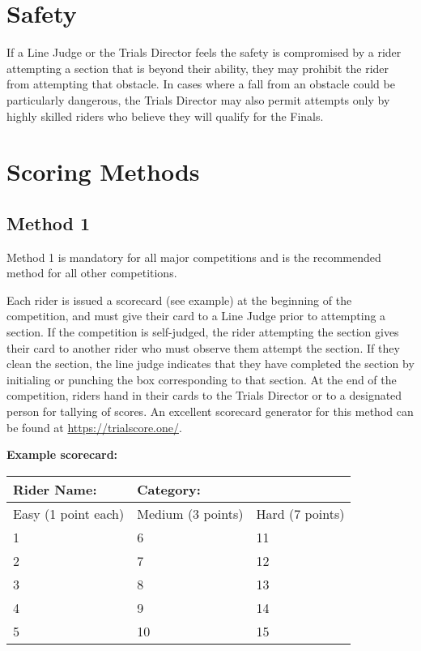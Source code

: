 \section{Safety}

If a Line Judge or the Trials Director feels the safety is compromised by a rider attempting a section that is beyond their ability, they may prohibit the rider from attempting that obstacle.
In cases where a fall from an obstacle could be particularly dangerous, the Trials Director may also permit attempts only by highly skilled riders who believe they will qualify for the Finals.

\section{Scoring Methods}

\subsection{Method 1}
Method 1 is mandatory for all major competitions and is the recommended method for all other competitions.

Each rider is issued a scorecard (see example) at the beginning of the competition, and must give their card to a Line Judge prior to attempting a section.
If the competition is self-judged, the rider attempting the section gives their card to another rider who must observe them attempt the section.
If they clean the section, the line judge indicates that they have completed the section by initialing or punching the box corresponding to that section.
At the end of the competition, riders hand in their cards to the Trials Director or to a designated person for tallying of scores.
An excellent scorecard generator for this method can be found at \url{https://trialscore.one/}.

\textbf{Example scorecard:}

\begin{tabular}{|l|l|l|}
\hline
\textbf{Rider Name:} & \textbf{Category:} & \\
\hline
Easy (1 point each) & Medium (3 points) & Hard (7 points) \\
\hline
1 & 6 & 11 \\
\hline
2 & 7 & 12 \\
\hline
3 & 8 & 13 \\
\hline
4 & 9 & 14 \\
\hline
5 & 10 & 15 \\
\hline
\end{tabular}

